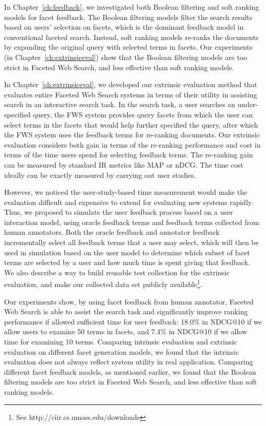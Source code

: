 In Chapter~\ref{ch:feedback}, we investigated both Boolean filtering and soft ranking models for facet feedback. The Boolean filtering models filter the search results based on users' selection on facets, which is the dominant feedback model in conventional faceted search. Instead, soft ranking models re-ranks the documents by expanding the original query with selected terms in facets. Our experiments (in Chapter~\ref{ch:extrinsiceval}) show that the Boolean filtering models are too strict in Faceted Web Search, and less effective than soft ranking models.

In Chapter~\ref{ch:extrinsiceval}, we developed our extrinsic evaluation method that evaluates entire Faceted Web Search systems in terms of their utility in assisting search in an interactive search task. In the search task, a user searches an under-specified query, the FWS system provides query facets from which the user can select terms in the facets that would help further specified the query, after which the FWS system uses the feedback terms for re-ranking documents. Our extrinsic evaluation considers both gain in terms of the re-ranking performance and cost in terms of the time users spend for selecting feedback terms. The re-ranking gain can be measured by standard IR metrics like MAP or nDCG. The time cost ideally can be exactly measured by carrying out user studies. 

However, we noticed the user-study-based time measurement would make the evaluation difficult and expensive to extend for evaluating new systems rapidly. Thus, we proposed to simulate the user feedback process based on a user interaction model, using oracle feedback terms and feedback terms collected from human annotators. Both the oracle feedback and annotator feedback incrementally select all feedback terms that a user may select, which will then be used in simulation based on the user model to determine which subset of facet terms are selected by a user and how much time is spent giving that feedback. We also describe a way to build reusable test collection for the extrinsic evaluation, and make our collected data set publicly available\footnote{See http://ciir.cs.umass.edu/downloads}.

Our experiments show, by using facet feedback from human annotator, Faceted Web Search is able to assist the search task and significantly improve ranking performance if allowed sufficient time for user feedback: 18.0\% in NDCG@10 if we allow users to examine 50 terms in facets, and 7.4\% in NDCG@10 if we allow time for examining 10 terms. Comparing intrinsic evaluation and extrinsic evaluation on different facet generation models, we found that the intrinsic evaluation does not always reflect system utility in real application. Comparing different facet feedback models, as mentioned earlier, we found that the Boolean filtering models are too strict in Faceted Web Search, and less effective than soft ranking models.

